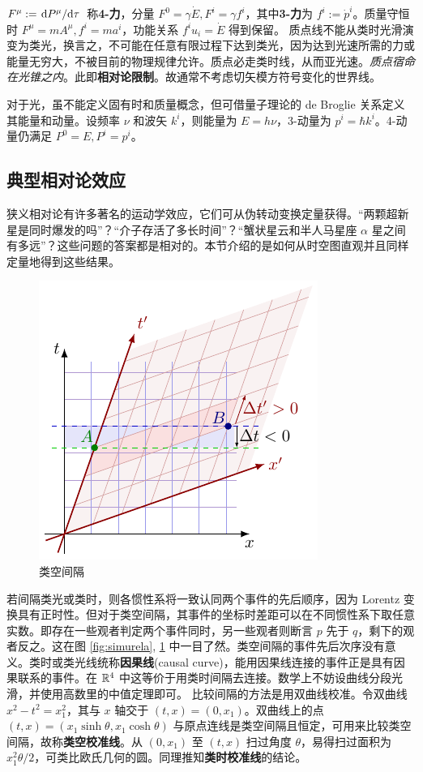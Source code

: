 $F^\mu:=\dv*{P^\mu}{\tau}$ 称\textbf{4-力}，分量 $F^0=\gamma\dot{E},F^i=\gamma f^i$，其中\textbf{3-力}为 $f^i:=\dot{p}^i$。质量守恒时 $F^\mu=m A^\mu,f^i=m a^i$，功能关系 $f^i u_i=\dot{E}$ 得到保留。
质点线不能从类时光滑演变为类光，换言之，不可能在任意有限过程下达到类光，因为达到光速所需的力或能量无穷大，不被目前的物理规律允许。质点必走类时线，从而亚光速。\textit{质点宿命在光锥之内}。此即\textbf{相对论限制}。故通常不考虑切矢模方符号变化的世界线。

对于光，虽不能定义固有时和质量概念，但可借量子理论的 de Broglie 关系定义其能量和动量。设频率 $\nu$ 和波矢 $k^i$，则能量为 $E=h\nu$，3-动量为 $p^i = \hbar k^i$。4-动量仍满足 $P^0=E,P^i=p^i$。

\subsection{典型相对论效应}

狭义相对论有许多著名的运动学效应，它们可从伪转动变换定量获得。“两颗超新星是同时爆发的吗”？“介子存活了多长时间”？“蟹状星云和半人马星座 $\alpha$ 星之间有多远”？这些问题的答案都是相对的。本节介绍的是如何从时空图直观并且同样定量地得到这些结果。

\begin{figure}[ht]
    \centering
    \includegraphics[width=.45\textwidth]{fig/chpt01/order.pdf}
    \caption{类空间隔}
    \label{fig:spacelike}
\end{figure}

若间隔类光或类时，则各惯性系将一致认同两个事件的先后顺序，因为 Lorentz 变换具有正时性。但对于类空间隔，其事件的坐标时差距可以在不同惯性系下取任意实数。即存在一些观者判定两个事件同时，另一些观者则断言 $p$ 先于 $q$，剩下的观者反之。这在图 \ref{fig:simurela}, \ref{fig:spacelike} 中一目了然。类空间隔的事件先后次序没有意义。类时或类光线统称\textbf{因果线}(causal curve)，能用因果线连接的事件正是具有因果联系的事件。在 $\mathbb{R}^4$ 中这等价于用类时间隔去连接。数学上不妨设曲线分段光滑，并使用高数里的中值定理即可。
    比较间隔的方法是用双曲线校准。令双曲线 $x^2-t^2=x_1^2$，其与 $x$ 轴交于 $\left(t,x\right)=(0,x_1)$。双曲线上的点 $(t,x)=(x_1\sinh\theta, x_1\cosh\theta)$
    与原点连线是类空间隔且恒定，可用来比较类空间隔，故称\textbf{类空校准线}。从 $(0,x_1)$ 至 $(t,x)$ 扫过角度 $\theta$，易得扫过面积为 $x_1^2\theta/2$，可类比欧氏几何的圆。同理推知\textbf{类时校准线}的结论。

